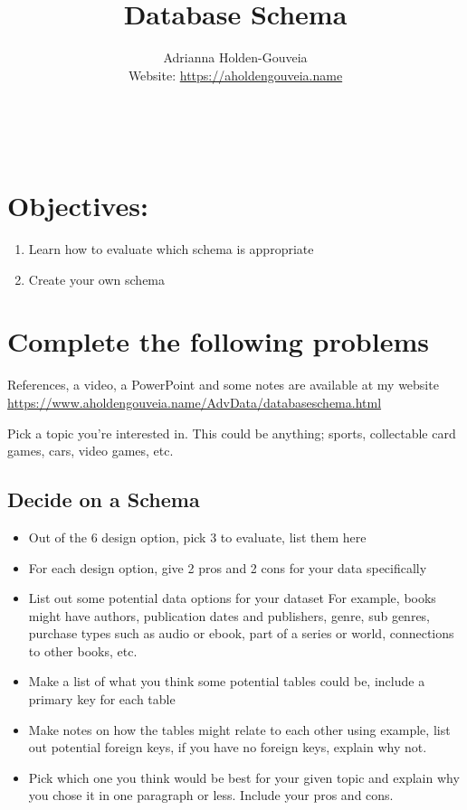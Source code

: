 \documentclass[12pt]{article}
\title{Database Schema}
\author{
        Adrianna Holden-Gouveia \\
        Website: \url{https://aholdengouveia.name}\\ 
        \date{\vspace{-5ex}}
        \faLinkedin{: aholdengouveia} \\
        \faGithub {: aholdengouveia} \\
        }
\begin{document}
    

\maketitle


\section*{Objectives:}
\begin{enumerate}
    \item Learn how to evaluate which schema is appropriate
    \item Create your own schema
\end{enumerate}
\section*{Complete the following problems}

References, a video, a PowerPoint and some notes are available at my website
\url {https://www.aholdengouveia.name/AdvData/databaseschema.html}

Pick a topic you're interested in.  This could be anything; sports, collectable card games, cars, video games, etc. 



\subsection*{Decide on a Schema}
    \begin{itemize}
        \item Out of the 6 design option, pick 3 to evaluate, list them here
        \item For each design option, give 2 pros and 2 cons for your data specifically
        \item List out some potential data options for your dataset
            For example, books might have authors, publication dates and publishers, genre, sub genres, purchase types such as audio or ebook, part of a series or world, connections to other books, etc.
        \item Make a list of what you think some potential tables could be, include a primary key for each table
        \item Make notes on how the tables might relate to each other using example, list out potential foreign keys, if you have no foreign keys, explain why not.
        \item Pick which one you think would be best for your given topic and explain why you chose it in one paragraph or less. Include your pros and cons.
    \end{itemize}
\end{document}
